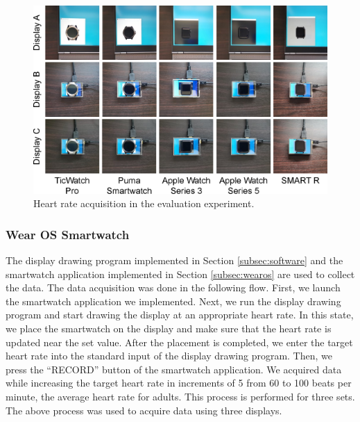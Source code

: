 \documentclass[sigchi,authordraft]{acmart}
\begin{document}
\begin{figure}[!t]
  \centering
  \includegraphics[width=1\linewidth]{figures/smartwatches.eps}
  \caption{Heart rate acquisition in the evaluation experiment.}
  \label{fig:smartwatches}
\end{figure}


\subsubsection{Wear OS Smartwatch}
The display drawing program implemented in Section \ref{subsec:software} and the smartwatch application implemented in Section \ref{subsec:wearos} are used to collect the data. The data acquisition was done in the following flow. First, we launch the smartwatch application we implemented. Next, we run the display drawing program and start drawing the display at an appropriate heart rate. In this state, we place the smartwatch on the display and make sure that the heart rate is updated near the set value. After the placement is completed, we enter the target heart rate into the standard input of the display drawing program. Then, we press the ``RECORD'' button of the smartwatch application. We acquired data while increasing the target heart rate in increments of 5 from 60 to 100 beats per minute, the average heart rate for adults\cite{average_heart_rate}. This process is performed for three sets. The above process was used to acquire data using three displays.


\end{document}
